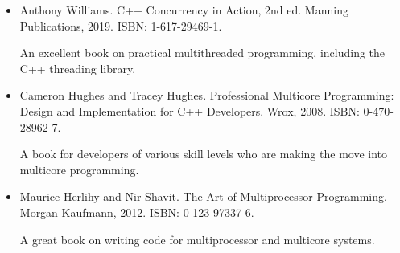 

\begin{itemize}
\item
Anthony Williams. C++ Concurrency in Action, 2nd ed. Manning Publications, 2019. ISBN: 1-617-29469-1.

An excellent book on practical multithreaded programming, including the C++ threading library.

\item
Cameron Hughes and Tracey Hughes. Professional Multicore Programming: Design and Implementation for C++ Developers. Wrox, 2008. ISBN: 0-470-28962-7.

A book for developers of various skill levels who are making the move into multicore programming.

\item
Maurice Herlihy and Nir Shavit. The Art of Multiprocessor Programming. Morgan Kaufmann, 2012. ISBN: 0-123-97337-6.

A great book on writing code for multiprocessor and multicore systems.
\end{itemize}